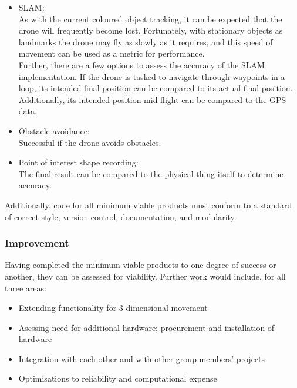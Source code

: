 \documentclass[a4paper, 12pt, titlepage]{article}
\begin{document}
		\begin{itemize}
		\item SLAM:
		\\As with the current coloured object tracking, it can be expected that the drone will frequently become lost. Fortunately, with stationary objects as landmarks the drone may fly as slowly as it requires, and this speed of movement can be used as a metric for performance.
		\\Further, there are a few options to assess the accuracy of the SLAM implementation. If the drone is tasked to navigate through waypoints in a loop, its intended final position can be compared to its actual final position. Additionally, its intended position mid-flight can be compared to the GPS data.
		
  		\item Obstacle avoidance:
  		\\Successful if the drone avoids obstacles.
  		
  		\item Point of interest shape recording:
  		\\The final result can be compared to the physical thing itself to determine accuracy.
  		
  		\end{itemize}
  		Additionally, code for all minimum viable products must conform to a standard of correct style, version control, documentation, and modularity.
  		
  		\subsubsection{Improvement}
  		Having completed the minimum viable products to one degree of success or another, they can be assessed for viability. Further work would include, for all three areas:
  		\begin{itemize}
  		 
  		\item Extending functionality for 3 dimensional movement
  		
  		\item Asessing need for additional hardware; procurement and installation of hardware
  		
  		\item Integration with each other and with other group members' projects
  		
  		\item Optimisations to reliability and computational expense
  		
  		\end{itemize}
  		
\end{document}
